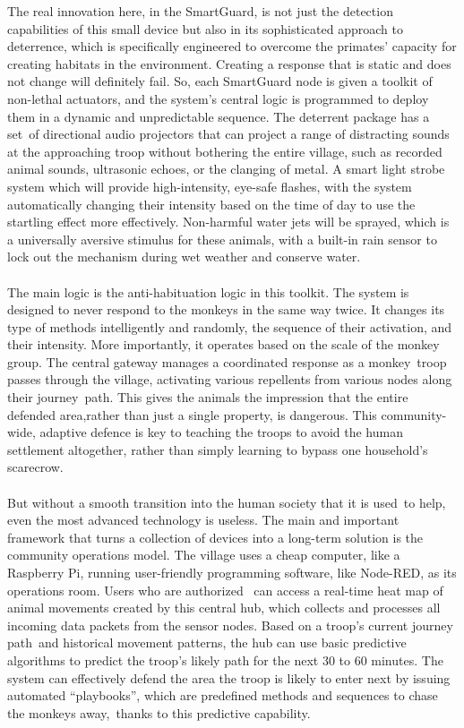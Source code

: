 \documentclass{article}
\begin{document}
The real innovation here, in the SmartGuard, is not just the detection capabilities of this small device but also in its sophisticated approach to deterrence, which is specifically engineered to overcome the primates' capacity for creating habitats in the environment. Creating a response that is static and does not change will definitely fail. So, each SmartGuard node is given a toolkit of non-lethal actuators, and the system's central logic is programmed to deploy them in a dynamic and unpredictable sequence. The deterrent package has a set of directional audio projectors that can project a range of distracting sounds at the approaching troop without bothering the entire village, such as recorded animal sounds, ultrasonic echoes, or the clanging of metal. A smart light strobe system which will provide high-intensity, eye-safe flashes, with the system automatically changing their intensity based on the time of day to use the startling effect more effectively. Non-harmful water jets will be sprayed, which is a universally aversive stimulus for these animals, with a built-in rain sensor to lock out the mechanism during wet weather and conserve water.
\\ \\
The main logic is the anti-habituation logic in this toolkit. The system is designed to never respond to the monkeys in the same way twice. It changes its type of methods intelligently and randomly, the sequence of their activation, and their intensity. More importantly, it operates based on the scale of the monkey group. The central gateway manages a coordinated response as a monkey troop passes through the village, activating various repellents from various nodes along their journey path.  This gives the animals the impression that the entire defended area,rather than just a single property, is dangerous. This community-wide, adaptive defence is key to teaching the troops to avoid the human settlement altogether, rather than simply learning to bypass one household’s scarecrow.
\\ \\
But without a smooth transition into the human society that it is used to help, even the most advanced technology is useless.  The main and important framework that turns a collection of devices into a long-term solution is the community operations model. The village uses a cheap computer, like a Raspberry Pi, running user-friendly programming software, like Node-RED, as its operations room. Users who are authorized  can access a real-time heat map of animal movements created by this central hub, which collects and processes all incoming data packets from the sensor nodes. Based on a troop's current journey path and historical movement patterns, the hub can use basic predictive algorithms to predict the troop's likely path for the next 30 to 60 minutes.  The system can effectively defend the area the troop is likely to enter next by issuing automated \enquote{playbooks}, which are predefined methods and sequences to chase the monkeys away, thanks to this predictive capability.
\end{document}
